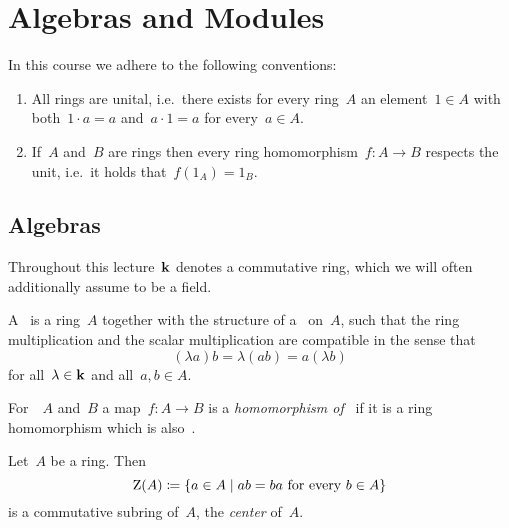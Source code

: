 \chapter{Algebras and Modules}


\begin{conventions}
  In this course we adhere to the following conventions:
  \begin{enumerate}
    \item
      All rings are unital, i.e.\ there exists for every ring~$A$ an element~$1 \in A$ with both~$1 \cdot a = a$ and~$a \cdot 1 = a$ for every~$a \in A$.
    \item
      If~$A$ and~$B$ are rings then every ring homomorphism~$f \colon A \to B$ respects the unit, i.e.\ it holds that~$f(1_A) = 1_B$.
  \end{enumerate}
\end{conventions}





\section{Algebras}


\begin{conventions}
  Throughout this lecture~$\mathbf{k}$ denotes a commutative ring, which we will often additionally assume to be a field.
\end{conventions}


\begin{definition}
  A~\emph{{\kalg}} is a ring~$A$ together with the structure of a~{\kmod} on~$A$, such that the ring multiplication and the scalar multiplication are compatible in the sense that
  \begin{equation}
    \label{compatibility of multiplications}
      (\lambda a) b
    = \lambda (ab)
    = a (\lambda b)
  \end{equation}
  for all~$\lambda \in \mathbf{k}$ and all~$a, b \in A$.
\end{definition}


\begin{definition}
  For~{\kalgs}~$A$ and~$B$ a map~$f \colon A \to B$ is a \emph{homomorphism of~{\kalgs}} if it is a ring homomorphism which is also~{\klin}.
\end{definition}


\begin{remark}
  Let~$A$ be a ring.
  Then
  \[
              \ringcenter(A)
    \defined  \{
                a \in A
              \suchthat
                \text{$ab = ba$ for every~$b \in A$}
              \}
  \]
  is a commutative subring of~$A$, the \emph{center} of~$A$.
\end{remark}


